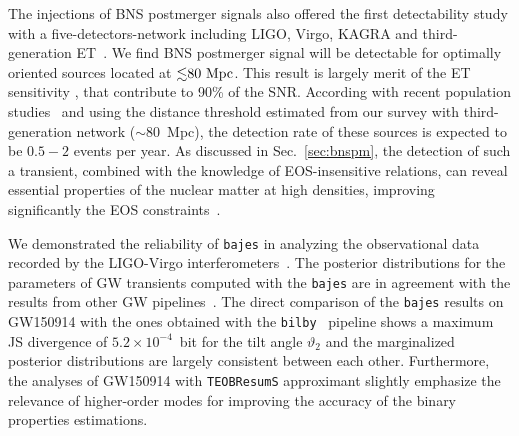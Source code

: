 \documentclass[prd,aps,twocolumn,a4paper,showkeys,nofootinbib,floatfix]{revtex4-1}
\newcommand{\bajes}{{\tt bajes}}
\begin{document}
The injections of BNS postmerger signals also offered the
  first detectability study with a 
five-detectors-network including LIGO, Virgo, KAGRA 
and third-generation ET~\cite{Punturo:2010zz,Hild:2010id}.
We find BNS postmerger signal
  will be detectable for optimally oriented  sources located at
${\lesssim}80~{\rm Mpc}$.
This result is largely merit of the ET  sensitivity 
  \cite{Punturo:2010zz,Hild:2010id}, that contribute to 90\% of the SNR.
According with recent
population studies~\cite{Abbott:2020gyp} and
using the distance threshold estimated from our survey
with third-generation network (${\sim}$80~Mpc), the detection rate of these
sources is expected to be $0.5{-}2$ events per year.  
As discussed in Sec.~\ref{sec:bnspm},
the detection of such a transient, combined with the 
knowledge of EOS-insensitive relations, can reveal essential properties 
of the nuclear matter at high densities, improving significantly
the EOS constraints~\cite{Breschi:2019srl}.

We demonstrated the reliability of {\bajes} in analyzing the observational data recorded by the LIGO-Virgo interferometers~\cite{LIGOScientific:2018mvr,Abbott:2019ebz}.
The posterior distributions for the parameters
 of GW transients computed with the {\bajes} are in agreement with
 the results from other GW pipelines~\cite{Veitch:2014wba,Lange:2018pyp}.
 The direct comparison of the {\bajes} results on GW150914 with 
 the ones obtained with the {\tt bilby}~\cite{Ashton:2018jfp,Smith:2019ucc,Romero-Shaw:2020owr} pipeline shows a maximum JS divergence 
 of $5.2{\times}10^{-4}$~bit for the tilt angle $\vartheta_2$ and the marginalized
 posterior distributions are largely consistent between each other.
 Furthermore, the analyses of GW150914 with {\tt TEOBResumS} approximant
slightly emphasize the relevance 
 of higher-order modes for improving the accuracy of the 
 binary properties estimations.
 
\end{document}
